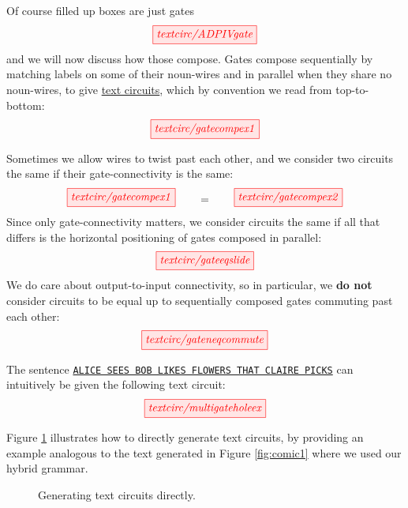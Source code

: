 Of course filled up boxes are just gates
\[
\tikzfig{textcirc/ADPIVgate}
\]
and we will now discuss how those compose. Gates compose sequentially by matching labels on some of their noun-wires and in parallel when they share no noun-wires,  to give \underline{text circuits}, which by convention we read from top-to-bottom:  
\[
\tikzfig{textcirc/gatecompex1}  
\]

\begin{convention}\label{conv:sliding}
Sometimes we allow wires to twist past each other, and we consider two circuits the same if their gate-connectivity is the same:
\[
\tikzfig{textcirc/gatecompex1} \quad\quad = \quad\quad \tikzfig{textcirc/gatecompex2}
\]
Since only gate-connectivity matters, we consider circuits the same if all that differs is the horizontal positioning of gates composed in parallel:
\[
\tikzfig{textcirc/gateeqslide} 
\]
We do care about output-to-input connectivity, so in particular, we {\bR\bf do not\e}
consider circuits to be equal up to sequentially composed gates commuting past each other:  
\[
\tikzfig{textcirc/gateneqcommute}  
\]
\end{convention}

\begin{example}  
The sentence \texttt{\underline{ALICE SEES BOB LIKES FLOWERS THAT CLAIRE PICKS}} can intuitively be given the following text circuit:
\[
\tikzfig{textcirc/multigateholeex}
\]
\end{example}

\begin{example}
Figure \ref{fig:circuitgen} illustrates how to directly generate text circuits, by providing an example analogous to the text generated in Figure \ref{fig:comic1} where we used our hybrid grammar.
\begin{figure}[h!]
    \centering
    \caption{Generating text circuits directly.}
    \label{fig:circuitgen}
\end{figure}
\end{example}